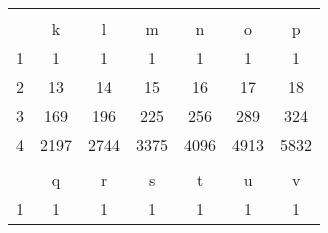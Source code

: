 \documentclass[review,12pt]{elsarticle}
\begin{document}
\begin{table}[htbp!]
\begin{tabular}{ccccccc}
                         &                            &                                               &                                               &                                               &                                               &                            \\
                         & k                          & l                                             & m                                             & n                                             & o                                             & p                          \\ \hline
\multicolumn{1}{|c|}{1}  & \multicolumn{1}{c|}{1}     & \multicolumn{1}{c|}{1}                        & \multicolumn{1}{c|}{1}                        & \multicolumn{1}{c|}{1}                        & \multicolumn{1}{c|}{1}                        & \multicolumn{1}{c|}{1}     \\ \hline
\multicolumn{1}{|c|}{2}  & \multicolumn{1}{c|}{13}    & \multicolumn{1}{c|}{14}                       & \multicolumn{1}{c|}{15}                       & \multicolumn{1}{c|}{16}                       & \multicolumn{1}{c|}{17}                       & \multicolumn{1}{c|}{18}    \\ \hline
\multicolumn{1}{|c|}{3}  & \multicolumn{1}{c|}{169}   & \multicolumn{1}{c|}{196}                      & \multicolumn{1}{c|}{225}                      & \multicolumn{1}{c|}{256}                      & \multicolumn{1}{c|}{289}                      & \multicolumn{1}{c|}{324}   \\ \hline
\multicolumn{1}{|c|}{4}  & \multicolumn{1}{c|}{2197}  & \multicolumn{1}{c|}{2744}                     & \multicolumn{1}{c|}{3375}                     & \multicolumn{1}{c|}{4096}                     & \multicolumn{1}{c|}{4913}                     & \multicolumn{1}{c|}{5832}  \\ \hline
                         &                            &                                               &                                               &                                               &                                               &                            \\
                         & q                          & r                                             & s                                             & t                                             & u                                             & v                          \\ \hline
\multicolumn{1}{|c|}{1}  & \multicolumn{1}{c|}{1}     & \multicolumn{1}{c|}{1}                        & \multicolumn{1}{c|}{1}                        & \multicolumn{1}{c|}{1}                        & \multicolumn{1}{c|}{1}                        & \multicolumn{1}{c|}{1}     \\ \hline

\end{tabular}
\end{table}
\end{document}
